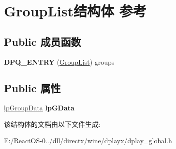 \hypertarget{struct_group_list}{}\section{Group\+List结构体 参考}
\label{struct_group_list}
\subsection*{Public 成员函数}
\begin{DoxyCompactItemize}
\item 
\mbox{\label{struct_group_list_afc7a739a7ece51e4428f466b51eb8c8c}} 
{\bfseries D\+P\+Q\+\_\+\+E\+N\+T\+RY} (\hyperlink{struct_group_list}{Group\+List}) groups
\end{DoxyCompactItemize}
\subsection*{Public 属性}
\begin{DoxyCompactItemize}
\item 
\mbox{\label{struct_group_list_a4745cc94bffc2700b903300dfa281bba}} 
\hyperlink{struct_group_data}{lp\+Group\+Data} {\bfseries lp\+G\+Data}
\end{DoxyCompactItemize}


该结构体的文档由以下文件生成\+:\begin{DoxyCompactItemize}
\item 
E\+:/\+React\+O\+S-\/0../dll/directx/wine/dplayx/dplay\+\_\+global.\+h\end{DoxyCompactItemize}

